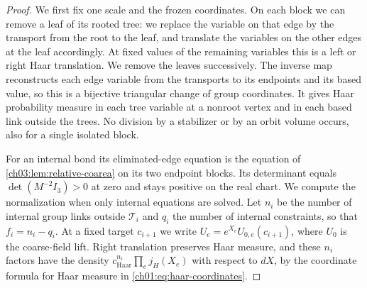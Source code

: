 \begin{proof}
We first fix one scale and the frozen coordinates. On each block we can remove a leaf of its rooted tree: we replace the variable on that edge by the transport from the root to the leaf, and translate the variables on the other edges at the leaf accordingly. At fixed values of the remaining variables this is a left or right Haar translation. We remove the leaves successively. The inverse map reconstructs each edge variable from the transports to its endpoints and its based value, so this is a bijective triangular change of group coordinates. It gives Haar probability measure in each tree variable at a nonroot vertex and in each based link outside the trees. No division by a stabilizer or by an orbit volume occurs, also for a single isolated block.

For an internal bond its eliminated-edge equation is the equation of \cref{ch03:lem:relative-coarea} on its two endpoint blocks. Its determinant equals $\det(M^{-2}I_3)>0$ at zero and stays positive on the real chart. We compute the normalization when only internal equations are solved. Let $n_i$ be the number of internal group links outside $\mathcal T_i$ and $q_i$ the number of internal constraints, so that $f_i=n_i-q_i$. At a fixed target $c_{i+1}$ we write $U_e=e^{X_e}U_{0,e}(c_{i+1})$, where $U_0$ is the coarse-field lift. Right translation preserves Haar measure, and these $n_i$ factors have the density $c_{\mathrm{Haar}}^{n_i}\prod_e j_H(X_e)$ with respect to $dX$, by the coordinate formula for Haar measure in \eqref{ch01:eq:haar-coordinates}.


\end{proof}
